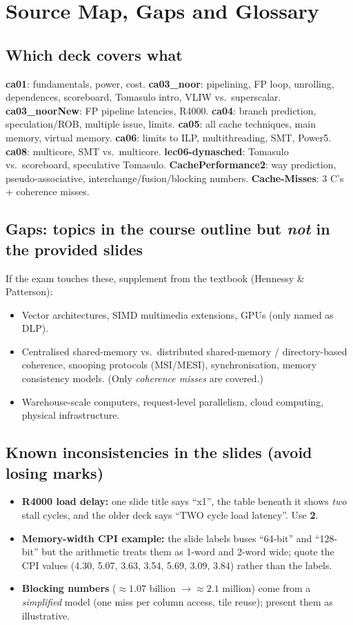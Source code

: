 \section{Source Map, Gaps and Glossary}\label{app:src}

\subsection{Which deck covers what}
\textbf{ca01}: fundamentals, power, cost. \textbf{ca03\_noor}: pipelining, FP loop, unrolling, dependences, scoreboard, Tomasulo intro, VLIW vs.\ superscalar. \textbf{ca03\_noorNew}: FP pipeline latencies, R4000. \textbf{ca04}: branch prediction, speculation/ROB, multiple issue, limits. \textbf{ca05}: all cache techniques, main memory, virtual memory. \textbf{ca06}: limits to ILP, multithreading, SMT, Power5. \textbf{ca08}: multicore, SMT vs.\ multicore. \textbf{lec06-dynasched}: Tomasulo vs.\ scoreboard, speculative Tomasulo. \textbf{CachePerformance2}: way prediction, pseudo-associative, interchange/fusion/blocking numbers. \textbf{Cache-Misses}: 3 C's + coherence misses.

\subsection{Gaps: topics in the course outline but \emph{not} in the provided slides}
If the exam touches these, supplement from the textbook (Hennessy \& Patterson):
\begin{itemize}
\item Vector architectures, SIMD multimedia extensions, GPUs (only named as DLP).
\item Centralised shared-memory vs.\ distributed shared-memory / directory-based coherence, snooping protocols (MSI/MESI), synchronisation, memory consistency models. (Only \emph{coherence misses} are covered.)
\item Warehouse-scale computers, request-level parallelism, cloud computing, physical infrastructure.
\end{itemize}

\subsection{Known inconsistencies in the slides (avoid losing marks)}
\begin{itemize}
\item \textbf{R4000 load delay:} one slide title says ``x1'', the table beneath it shows \emph{two} stall cycles, and the older deck says ``TWO cycle load latency''. Use \textbf{2}.
\item \textbf{Memory-width CPI example:} the slide labels buses ``64-bit'' and ``128-bit'' but the arithmetic treats them as 1-word and 2-word wide; quote the CPI values (4.30, 5.07, 3.63, 3.54, 5.69, 3.09, 3.84) rather than the labels.
\item \textbf{Blocking numbers} ($\approx1.07$ billion $\to\approx2.1$ million) come from a \emph{simplified} model (one miss per column access, tile reuse); present them as illustrative.
\end{itemize}

